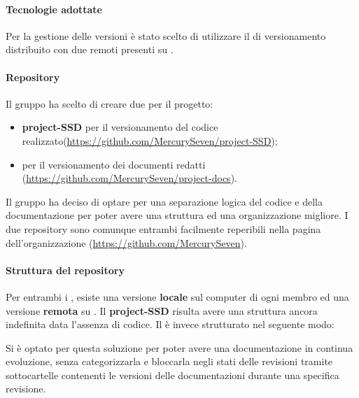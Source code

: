 \paragraph{Tecnologie adottate}
Per la gestione delle versioni è stato scelto di utilizzare il  di versionamento distribuito \textit{} con due  remoti presenti su \textit{}.
\paragraph{Repository}
Il gruppo \textit{\Gruppo{}} ha scelto di creare due  per il progetto:
\begin{itemize}
	\item \textbf{project-SSD} per il versionamento del codice realizzato(\url{https://github.com/MercurySeven/project-SSD});
	\item \textbf{\repoDoc{}} per il versionamento dei documenti redatti (\url{https://github.com/MercurySeven/project-docs}).
\end{itemize}
Il gruppo ha deciso di optare per una separazione logica del codice e della documentazione per poter avere una struttura ed una organizzazione migliore. I due repository sono comunque entrambi facilmente reperibili nella pagina dell'organizzazione (\url{https://github.com/MercurySeven}).
\paragraph{Struttura del repository}
Per entrambi i , esiste una versione \textbf{locale} sul computer di ogni membro ed una versione \textbf{remota} su \textit{}.\newline
Il  \textbf{project-SSD} risulta avere una struttura ancora indefinita data l'assenza di codice.\newline
Il  \textbf{\repoDoc{}} è invece strutturato nel seguente modo:
Si è optato per questa soluzione per poter avere una documentazione in continua evoluzione, senza categorizzarla e bloccarla negli stati delle revisioni tramite sottocartelle contenenti le versioni delle documentazioni durante una specifica revisione.
